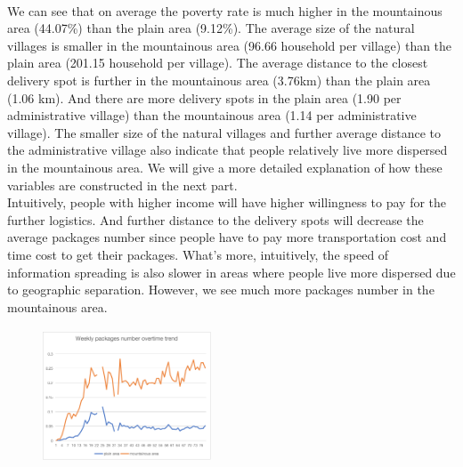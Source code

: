 \documentclass{article}
\begin{document}
\paragraph{ \newline}
\mbox{\hspace{2em}}
We can see that on average the poverty rate is much higher in the mountainous area (44.07\%) than the plain area (9.12\%). The average size of the natural villages is smaller in the mountainous area (96.66 household per village) than the plain area (201.15 household per village). The average distance to the closest delivery spot is further in the mountainous area (3.76km) than the plain area (1.06 km). And there are more delivery spots in the plain area (1.90 per administrative village) than the mountainous area (1.14 per administrative village). The smaller size of the natural villages and further average distance to the administrative village also indicate that people relatively live more dispersed in the mountainous area. We will give a more detailed explanation of how these variables are constructed in the next part.\\
\mbox{\hspace{2em}}  
Intuitively, people with higher income will have higher willingness to pay for the further logistics. And further distance to the delivery spots will decrease the average packages number since people have to pay more transportation cost and time cost to get their packages. What’s more, intuitively, the speed of information spreading is also slower in areas where people live more dispersed due to geographic separation. However, we see much more packages number in the mountainous area. \\   
\begin{figure}[H]                                        
    \centering                                                
    \includegraphics[width=5cm,height=4cm]{over-time.png}                                                                                         
\end{figure}                                             
\mbox{\hspace{2em}}
\end{document}
